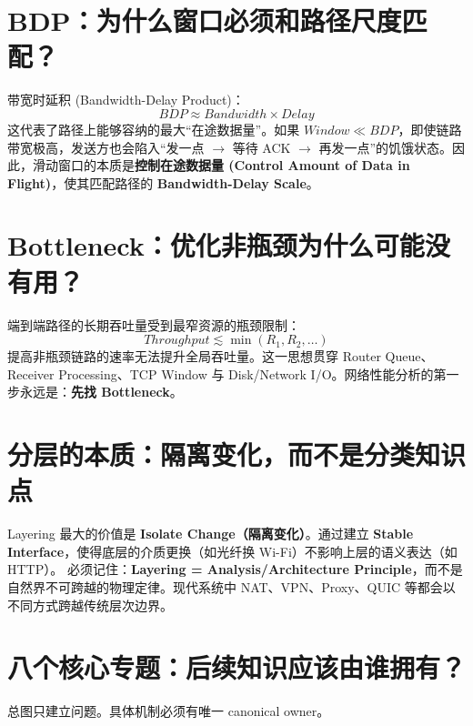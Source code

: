 \documentclass[11pt,a4paper,openany]{ctexbook}
\newcommand{\key}[1]{\textbf{\color{deep}#1}}
\begin{document}
\section{BDP：为什么窗口必须和路径尺度匹配？}
带宽时延积 (Bandwidth-Delay Product)：
\[
BDP \approx Bandwidth \times Delay
\]
这代表了路径上能够容纳的最大“在途数据量”。如果 $Window \ll BDP$，即使链路带宽极高，发送方也会陷入“发一点 $\rightarrow$ 等待 ACK $\rightarrow$ 再发一点”的饥饿状态。因此，滑动窗口的本质是\key{控制在途数据量 (Control Amount of Data in Flight)}，使其匹配路径的 \key{Bandwidth-Delay Scale}。

\section{Bottleneck：优化非瓶颈为什么可能没有用？}
端到端路径的长期吞吐量受到最窄资源的瓶颈限制：
\[
Throughput \lesssim \min(R_1, R_2, \ldots)
\]
提高非瓶颈链路的速率无法提升全局吞吐量。这一思想贯穿 Router Queue、Receiver Processing、TCP Window 与 Disk/Network I/O。网络性能分析的第一步永远是：\key{先找 Bottleneck}。

\section{分层的本质：隔离变化，而不是分类知识点}
Layering 最大的价值是 \key{Isolate Change（隔离变化）}。通过建立 \key{Stable Interface}，使得底层的介质更换（如光纤换 Wi-Fi）不影响上层的语义表达（如 HTTP）。
必须记住：\key{Layering = Analysis/Architecture Principle}，而不是自然界不可跨越的物理定律。现代系统中 NAT、VPN、Proxy、QUIC 等都会以不同方式跨越传统层次边界。

\section{八个核心专题：后续知识应该由谁拥有？}
总图只建立问题。具体机制必须有唯一 canonical owner。
\end{document}
